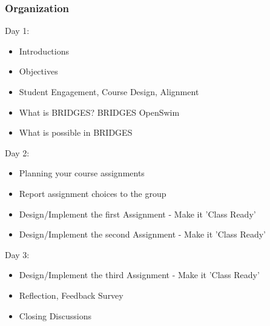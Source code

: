 \documentclass[aspectratio=169]{beamer}
\begin{document}
\begin{frame}
  \frametitle{Organization}

  Day 1:
  \begin{itemize}
  \item Introductions
  \item Objectives
  \item Student Engagement, Course Design, Alignment
  \item What is BRIDGES? BRIDGES OpenSwim
  \item What is possible in BRIDGES
  \end{itemize}
  
  Day 2:
  \begin{itemize}
  \item Planning your course assignments
  \item Report assignment choices to the group
  \item Design/Implement the first Assignment - Make it 'Class Ready'
  \item Design/Implement the second Assignment - Make it 'Class Ready' 
  \end{itemize}

  
  Day 3:
  \begin{itemize}
  \item Design/Implement the third Assignment - Make it 'Class Ready'
  \item Reflection, Feedback Survey
  \item Closing Discussions
  \end{itemize}
  
\end{frame}
\end{document}

